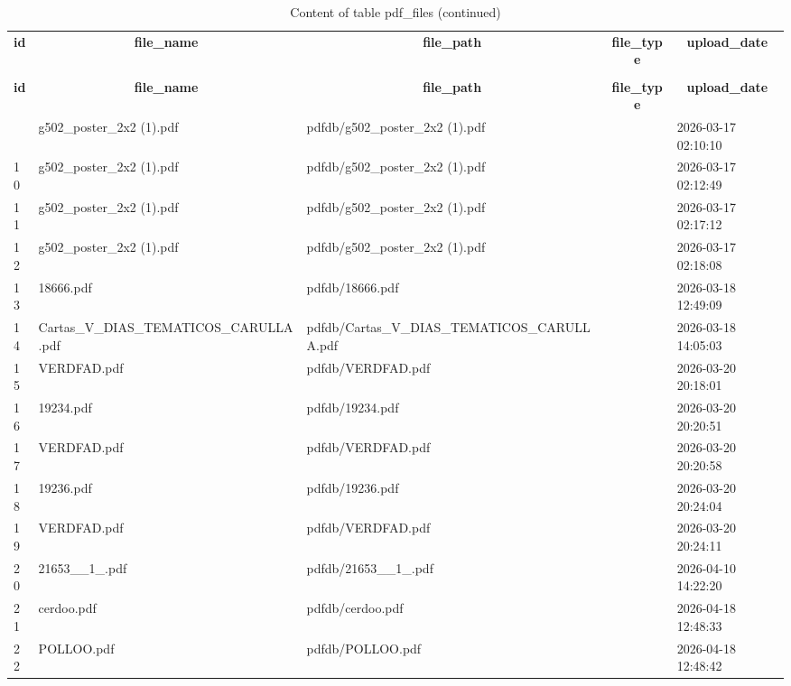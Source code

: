 %
%
 \begin{longtable}{|l|l|l|l|l|} 
 \hline \endhead \hline \endfoot \hline 
 \caption{Content of table pdf\_files} \label{tab:pdf_files-data} \\\hline \multicolumn{1}{|c|}{\textbf{id}} & \multicolumn{1}{|c|}{\textbf{file\_name}} & \multicolumn{1}{|c|}{\textbf{file\_path}} & \multicolumn{1}{|c|}{\textbf{file\_type}} & \multicolumn{1}{|c|}{\textbf{upload\_date}} \\ \hline \hline  \endfirsthead 
\caption{Content of table pdf\_files (continued)} \\ \hline \multicolumn{1}{|c|}{\textbf{id}} & \multicolumn{1}{|c|}{\textbf{file\_name}} & \multicolumn{1}{|c|}{\textbf{file\_path}} & \multicolumn{1}{|c|}{\textbf{file\_type}} & \multicolumn{1}{|c|}{\textbf{upload\_date}} \\ \hline \hline \endhead \endfoot
9 & g502\_poster\_2x2 (1).pdf & pdfdb/g502\_poster\_2x2 (1).pdf &  & 2026-03-17 02:10:10 \\ \hline 
10 & g502\_poster\_2x2 (1).pdf & pdfdb/g502\_poster\_2x2 (1).pdf &  & 2026-03-17 02:12:49 \\ \hline 
11 & g502\_poster\_2x2 (1).pdf & pdfdb/g502\_poster\_2x2 (1).pdf &  & 2026-03-17 02:17:12 \\ \hline 
12 & g502\_poster\_2x2 (1).pdf & pdfdb/g502\_poster\_2x2 (1).pdf &  & 2026-03-17 02:18:08 \\ \hline 
13 & 18666.pdf & pdfdb/18666.pdf &  & 2026-03-18 12:49:09 \\ \hline 
14 & Cartas\_V\_DIAS\_TEMATICOS\_CARULLA.pdf & pdfdb/Cartas\_V\_DIAS\_TEMATICOS\_CARULLA.pdf &  & 2026-03-18 14:05:03 \\ \hline 
15 & VERDFAD.pdf & pdfdb/VERDFAD.pdf &  & 2026-03-20 20:18:01 \\ \hline 
16 & 19234.pdf & pdfdb/19234.pdf &  & 2026-03-20 20:20:51 \\ \hline 
17 & VERDFAD.pdf & pdfdb/VERDFAD.pdf &  & 2026-03-20 20:20:58 \\ \hline 
18 & 19236.pdf & pdfdb/19236.pdf &  & 2026-03-20 20:24:04 \\ \hline 
19 & VERDFAD.pdf & pdfdb/VERDFAD.pdf &  & 2026-03-20 20:24:11 \\ \hline 
20 & 21653\_\_1\_.pdf & pdfdb/21653\_\_1\_.pdf &  & 2026-04-10 14:22:20 \\ \hline 
21 & cerdoo.pdf & pdfdb/cerdoo.pdf &  & 2026-04-18 12:48:33 \\ \hline 
22 & POLLOO.pdf & pdfdb/POLLOO.pdf &  & 2026-04-18 12:48:42 \\ \hline 

\end{longtable}
